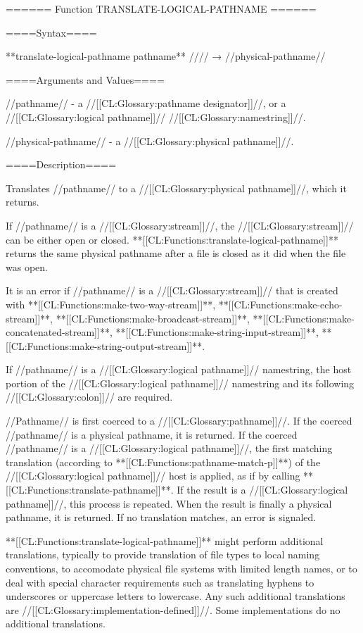 ====== Function TRANSLATE-LOGICAL-PATHNAME ======

====Syntax====

**translate-logical-pathname {pathname** //\key}// → //physical-pathname//

====Arguments and Values====

//pathname// - a //[[CL:Glossary:pathname designator]]//, or a //[[CL:Glossary:logical pathname]]// //[[CL:Glossary:namestring]]//.

//physical-pathname// - a //[[CL:Glossary:physical pathname]]//.

====Description====

Translates //pathname// to a //[[CL:Glossary:physical pathname]]//, which it returns.


If //pathname// is a //[[CL:Glossary:stream]]//, the //[[CL:Glossary:stream]]// can be either open or closed. **[[CL:Functions:translate-logical-pathname]]** returns the same physical pathname after a file is closed as it did when the file was open.

It is an error if //pathname// is a //[[CL:Glossary:stream]]// that is created with **[[CL:Functions:make-two-way-stream]]**, **[[CL:Functions:make-echo-stream]]**, **[[CL:Functions:make-broadcast-stream]]**, **[[CL:Functions:make-concatenated-stream]]**, **[[CL:Functions:make-string-input-stream]]**, **[[CL:Functions:make-string-output-stream]]**.

If //pathname// is a //[[CL:Glossary:logical pathname]]// namestring, the host portion of the //[[CL:Glossary:logical pathname]]// namestring and its following //[[CL:Glossary:colon]]// are required.


//Pathname// is first coerced to a //[[CL:Glossary:pathname]]//. If the coerced //pathname// is a physical pathname, it is returned. If the coerced //pathname// is a //[[CL:Glossary:logical pathname]]//, the first matching translation (according to **[[CL:Functions:pathname-match-p]]**) of the //[[CL:Glossary:logical pathname]]// host is applied, as if by calling **[[CL:Functions:translate-pathname]]**. If the result is a //[[CL:Glossary:logical pathname]]//, this process is repeated. When the result is finally a physical pathname, it is returned. If no translation matches, an error is signaled.

**[[CL:Functions:translate-logical-pathname]]** might perform additional translations, typically to provide translation of file types to local naming conventions, to accomodate physical file systems with limited length names, or to deal with special character requirements such as translating hyphens to underscores or uppercase letters to lowercase. Any such additional translations are //[[CL:Glossary:implementation-defined]]//. Some implementations do no additional translations.

